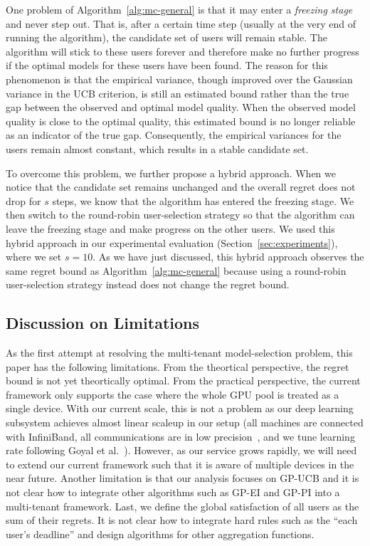 \documentclass[letterpaper]{vldb}
\begin{document}
One problem of Algorithm~\ref{alg:mc-general} is that it may enter a \emph{freezing stage} and never step out.
That is, after a certain time step (usually at the very end of running the algorithm), the candidate set of users will remain stable.
The algorithm will stick to these users forever and therefore make no further progress if the optimal models for these users have been found.
The reason for this phenomenon is that the empirical variance, though improved over the Gaussian variance in the UCB criterion, is still an estimated bound rather than the true gap between the observed and optimal model quality.
When the observed model quality is close to the optimal quality, this estimated bound is no longer reliable as an indicator of the true gap.
Consequently, the empirical variances for the users remain almost constant, which results in a stable candidate set.

To overcome this problem, we further propose a hybrid approach.
When we notice that the candidate set remains unchanged and the overall regret does not drop for $s$ steps,
we know that the algorithm has entered the freezing stage.
We then switch to the round-robin user-selection strategy so that the algorithm can leave the freezing stage and make progress on the other users.
We used this hybrid approach in our experimental evaluation (Section~\ref{sec:experiments}), where we set $s=10$.
As we have just discussed, this hybrid approach observes the same regret bound as Algorithm~\ref{alg:mc-general} because using a round-robin user-selection strategy instead does not change the regret bound.

\subsection{Discussion on Limitations} \label{sec:limitations}

As the first attempt
at resolving the multi-tenant model-selection problem,
this paper has the following limitations.
From the theortical perspective, the regret bound
is not yet theortically optimal.
From the practical perspective,
the current framework only supports the case where
the whole GPU pool is treated as a single device.
With our current scale, this is not
a problem as our deep learning
subsystem achieves almost linear scaleup
in our setup
(all machines are connected with InfiniBand,
all communications are in low precision~\cite{XXX},
and we tune learning rate following Goyal et al.~\cite{XXX}).
However, as our service grows
rapidly, we will need to extend our current framework
such that it is aware of multiple devices in the near future.
Another limitation is that our
analysis focuses on GP-UCB and it is not clear
how to integrate other algorithms such as
GP-EI and GP-PI into a multi-tenant 
framework. Last, we define the global
satisfaction of all users as the sum 
of their regrets. It is not clear how to
integrate hard rules such as the ``each user's deadline'' 
and design
algorithms for other aggregation functions.
\end{document}
